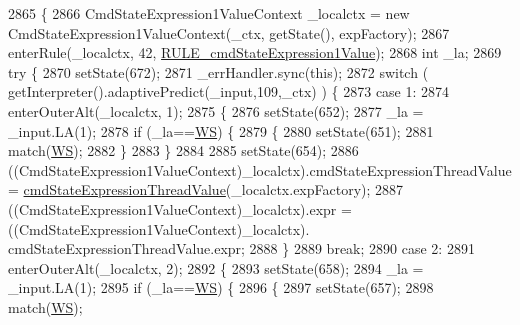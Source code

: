 \begin{DoxyCode}
2865                                                                                                            
                             \{
2866     CmdStateExpression1ValueContext \_localctx = \textcolor{keyword}{new} CmdStateExpression1ValueContext(\_ctx, getState(), 
      expFactory);
2867     enterRule(\_localctx, 42, \hyperlink{classgov_1_1nasa_1_1jpf_1_1inspector_1_1server_1_1expression_1_1parser_1_1_expression_grammar_parser_a7100ed6eb39d0cfd51a22748670ba354}{RULE\_cmdStateExpression1Value});
2868     \textcolor{keywordtype}{int} \_la;
2869     \textcolor{keywordflow}{try} \{
2870       setState(672);
2871       \_errHandler.sync(\textcolor{keyword}{this});
2872       \textcolor{keywordflow}{switch} ( getInterpreter().adaptivePredict(\_input,109,\_ctx) ) \{
2873       \textcolor{keywordflow}{case} 1:
2874         enterOuterAlt(\_localctx, 1);
2875         \{
2876         setState(652);
2877         \_la = \_input.LA(1);
2878         \textcolor{keywordflow}{if} (\_la==\hyperlink{classgov_1_1nasa_1_1jpf_1_1inspector_1_1server_1_1expression_1_1parser_1_1_expression_grammar_parser_ace44714ae633c7b14794cc5a24d9ebf3}{WS}) \{
2879           \{
2880           setState(651);
2881           match(\hyperlink{classgov_1_1nasa_1_1jpf_1_1inspector_1_1server_1_1expression_1_1parser_1_1_expression_grammar_parser_ace44714ae633c7b14794cc5a24d9ebf3}{WS});
2882           \}
2883         \}
2884 
2885         setState(654);
2886         ((CmdStateExpression1ValueContext)\_localctx).cmdStateExpressionThreadValue = 
      \hyperlink{classgov_1_1nasa_1_1jpf_1_1inspector_1_1server_1_1expression_1_1parser_1_1_expression_grammar_parser_aa83127fe4f65f96d5da73e78c7bbae2f}{cmdStateExpressionThreadValue}(\_localctx.expFactory);
2887          ((CmdStateExpression1ValueContext)\_localctx).expr =  ((CmdStateExpression1ValueContext)\_localctx).
      cmdStateExpressionThreadValue.expr; 
2888         \}
2889         \textcolor{keywordflow}{break};
2890       \textcolor{keywordflow}{case} 2:
2891         enterOuterAlt(\_localctx, 2);
2892         \{
2893         setState(658);
2894         \_la = \_input.LA(1);
2895         \textcolor{keywordflow}{if} (\_la==\hyperlink{classgov_1_1nasa_1_1jpf_1_1inspector_1_1server_1_1expression_1_1parser_1_1_expression_grammar_parser_ace44714ae633c7b14794cc5a24d9ebf3}{WS}) \{
2896           \{
2897           setState(657);
2898           match(\hyperlink{classgov_1_1nasa_1_1jpf_1_1inspector_1_1server_1_1expression_1_1parser_1_1_expression_grammar_parser_ace44714ae633c7b14794cc5a24d9ebf3}{WS});

\end{DoxyCode}
